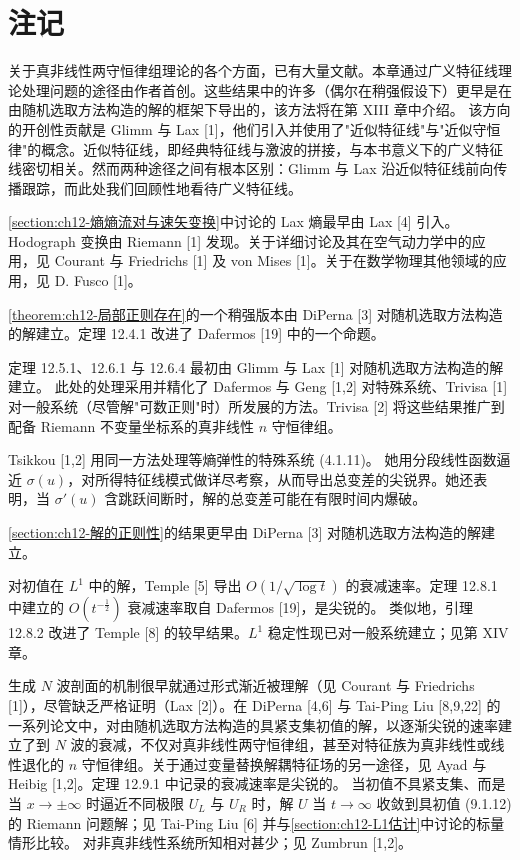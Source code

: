 \documentclass[../../main.tex]{subfiles}
\begin{document}
\section{注记}\label{section:ch12-注记}

关于真非线性两守恒律组理论的各个方面，已有大量文献。本章通过广义特征线理论处理问题的途径由作者首创。这些结果中的许多（偶尔在稍强假设下）更早是在由随机选取方法构造的解的框架下导出的，该方法将在第 XIII 章中介绍。
该方向的开创性贡献是 Glimm 与 Lax [1]，他们引入并使用了"近似特征线"与"近似守恒律"的概念。近似特征线，即经典特征线与激波的拼接，与本书意义下的广义特征线密切相关。然而两种途径之间有根本区别：Glimm 与 Lax 沿近似特征线前向传播跟踪，而此处我们回顾性地看待广义特征线。

\cref{section:ch12-熵熵流对与速矢变换}中讨论的 Lax 熵最早由 Lax [4] 引入。Hodograph 变换由 Riemann [1] 发现。关于详细讨论及其在空气动力学中的应用，见 Courant 与 Friedrichs [1] 及 von Mises [1]。关于在数学物理其他领域的应用，见 D. Fusco [1]。

\cref{theorem:ch12-局部正则存在}的一个稍强版本由 DiPerna [3] 对随机选取方法构造的解建立。定理 12.4.1 改进了 Dafermos [19] 中的一个命题。

定理 12.5.1、12.6.1 与 12.6.4 最初由 Glimm 与 Lax [1] 对随机选取方法构造的解建立。
此处的处理采用并精化了 Dafermos 与 Geng [1,2] 对特殊系统、Trivisa [1] 对一般系统（尽管解"可数正则"时）所发展的方法。Trivisa [2] 将这些结果推广到配备 Riemann 不变量坐标系的真非线性 $n$ 守恒律组。

Tsikkou [1,2] 用同一方法处理等熵弹性的特殊系统 (4.1.11)。
她用分段线性函数逼近 $\sigma(u)$，对所得特征线模式做详尽考察，从而导出总变差的尖锐界。她还表明，当 $\sigma'(u)$ 含跳跃间断时，解的总变差可能在有限时间内爆破。

\cref{section:ch12-解的正则性}的结果更早由 DiPerna [3] 对随机选取方法构造的解建立。

对初值在 $L^1$ 中的解，Temple [5] 导出 $O(1/\sqrt{\log t})$ 的衰减速率。定理 12.8.1 中建立的 $O(t^{-\frac12})$ 衰减速率取自 Dafermos [19]，是尖锐的。
类似地，引理 12.8.2 改进了 Temple [8] 的较早结果。$L^1$ 稳定性现已对一般系统建立；见第 XIV 章。

生成 $N$ 波剖面的机制很早就通过形式渐近被理解（见 Courant 与 Friedrichs [1]），尽管缺乏严格证明（Lax [2]）。在 DiPerna [4,6] 与 Tai-Ping Liu [8,9,22] 的一系列论文中，对由随机选取方法构造的具紧支集初值的解，以逐渐尖锐的速率建立了到 $N$ 波的衰减，不仅对真非线性两守恒律组，甚至对特征族为真非线性或线性退化的 $n$ 守恒律组。关于通过变量替换解耦特征场的另一途径，见 Ayad 与 Heibig [1,2]。定理 12.9.1 中记录的衰减速率是尖锐的。
当初值不具紧支集、而是当 $x\to\pm\infty$ 时逼近不同极限 $U_L$ 与 $U_R$ 时，解 $U$ 当 $t\to\infty$ 收敛到具初值 (9.1.12) 的 Riemann 问题解；见 Tai-Ping Liu [6] 并与\cref{section:ch12-L1估计}中讨论的标量情形比较。
对非真非线性系统所知相对甚少；见 Zumbrun [1,2]。
\end{document}
